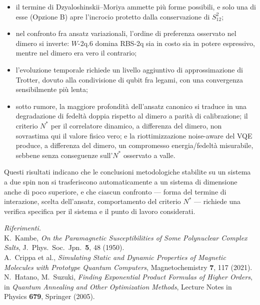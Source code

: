 \documentclass[11pt,a4paper]{article}
\begin{document}
\begin{itemize}[leftmargin=1.6em,itemsep=3pt]
\item il termine di Dzyaloshinskii--Moriya ammette più forme possibili,
e solo una di esse (Opzione B) apre l'incrocio protetto dalla
conservazione di $S_{12}^2$;
\item nel confronto fra ansatz variazionali, l'ordine di preferenza
osservato nel dimero si inverte: $W$-2q.6 domina RBS-2q sia in costo sia
in potere espressivo, mentre nel dimero era vero il contrario;
\item l'evoluzione temporale richiede un livello aggiuntivo di
approssimazione di Trotter, dovuto alla condivisione di qubit fra legami,
con una convergenza sensibilmente più lenta;
\item sotto rumore, la maggiore profondità dell'ansatz canonico si
traduce in una degradazione di fedeltà doppia rispetto al dimero a parità
di calibrazione; il criterio $N^*$ per il correlatore dinamico, a
differenza del dimero, non sovrastima qui il valore fisico vero; e la
riottimizzazione noise-aware del VQE produce, a differenza del dimero, un
compromesso energia/fedeltà misurabile, sebbene senza conseguenze
sull'$N^*$ osservato a valle.
\end{itemize}

Questi risultati indicano che le conclusioni metodologiche stabilite su
un sistema a due spin non si trasferiscono automaticamente a un sistema
di dimensione anche di poco superiore, e che ciascun confronto --- forma
del termine di interazione, scelta dell'ansatz, comportamento del
criterio $N^*$ --- richiede una verifica specifica per il sistema e il
punto di lavoro considerati.

\bigskip
\noindent\footnotesize\textit{Riferimenti.}\\
K.~Kambe, \emph{On the Paramagnetic Susceptibilities of Some Polynuclear
Complex Salts}, J.\ Phys.\ Soc.\ Jpn.\ \textbf{5}, 48 (1950).\\
A.~Crippa et al., \emph{Simulating Static and Dynamic Properties of
Magnetic Molecules with Prototype Quantum Computers}, Magnetochemistry
\textbf{7}, 117 (2021).\\
N.~Hatano, M.~Suzuki, \emph{Finding Exponential Product Formulas of
Higher Orders}, in \emph{Quantum Annealing and Other Optimization
Methods}, Lecture Notes in Physics \textbf{679}, Springer (2005).
\end{document}
